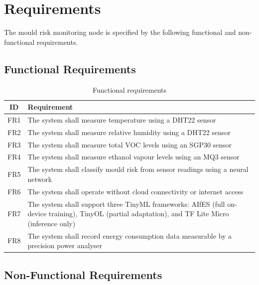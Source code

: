 \section{Requirements}

The mould risk monitoring node is specified by the following functional and non-functional requirements.

\subsection{Functional Requirements}

\begin{table}[H]
\centering
\caption{Functional requirements}
\label{tab:fr}
\begin{tabulary}{\textwidth}{|c|L|}
\hline
\textbf{ID} & \textbf{Requirement} \\
\hline
FR1 & The system shall measure temperature using a DHT22 sensor \\
\hline
FR2 & The system shall measure relative humidity using a DHT22 sensor \\
\hline
FR3 & The system shall measure total VOC levels using an SGP30 sensor \\
\hline
FR4 & The system shall measure ethanol vapour levels using an MQ3 sensor \\
\hline
FR5 & The system shall classify mould risk from sensor readings using a neural network \\
\hline
FR6 & The system shall operate without cloud connectivity or internet access \\
\hline
FR7 & The system shall support three TinyML frameworks: AIfES (full on-device training), TinyOL (partial adaptation), and TF Lite Micro (inference only) \\
\hline
FR8 & The system shall record energy consumption data measurable by a precision power analyser \\
\hline
\end{tabulary}
\end{table}

\subsection{Non-Functional Requirements}

